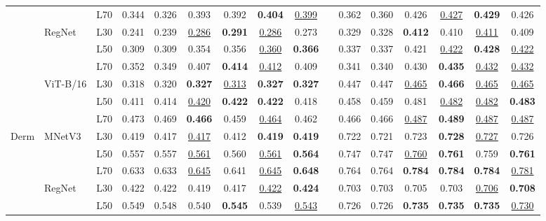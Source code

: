 \begin{table}[t]
{\begin{tabular}{lll cccccc |c cccccc}
 &  & L70 & 0.344 & 0.326 & 0.393 & 0.392 & \textbf{0.404} & \underline{0.399} & & 0.362 & 0.360 & 0.426 & \underline{0.427} & \textbf{0.429} & 0.426 \\
\cmidrule(lr){2-16}
 & \multirow{3}{*}{RegNet} & L30 & 0.241 & 0.239 & \underline{0.286} & \textbf{0.291} & \underline{0.286} & 0.273 & & 0.329 & 0.328 & \textbf{0.412} & 0.410 & \underline{0.411} & 0.409 \\
 &  & L50 & 0.309 & 0.309 & 0.354 & 0.356 & \underline{0.360} & \textbf{0.366} & & 0.337 & 0.337 & 0.421 & \underline{0.422} & \textbf{0.428} & \underline{0.422} \\
 &  & L70 & 0.352 & 0.349 & 0.407 & \textbf{0.414} & \underline{0.412} & 0.409 & & 0.341 & 0.340 & 0.430 & \textbf{0.435} & \underline{0.432} & \underline{0.432} \\
\cmidrule(lr){2-16}
 & \multirow{3}{*}{ViT-B/16} & L30 & 0.318 & 0.320 & \textbf{0.327} & \underline{0.313} & \textbf{0.327} & \textbf{0.327} & & 0.447 & 0.447 & \underline{0.465} & \textbf{0.466} & \underline{0.465} & \underline{0.465} \\
 &  & L50 & 0.411 & 0.414 & \underline{0.420} & \textbf{0.422} & \textbf{0.422} & 0.418 & & 0.458 & 0.459 & 0.481 & \underline{0.482} & \underline{0.482} & \textbf{0.483} \\
 &  & L70 & 0.473 & 0.469 & \textbf{0.466} & 0.459 & \underline{0.464} & 0.462 & & 0.466 & 0.466 & \underline{0.487} & \textbf{0.489} & \underline{0.487} & \underline{0.487} \\
\midrule
\multirow{9}{*}{Derm} & \multirow{3}{*}{MNetV3} & L30 & 0.419 & 0.417 & \underline{0.417} & 0.412 & \textbf{0.419} & \textbf{0.419} & & 0.722 & 0.721 & 0.723 & \textbf{0.728} & \underline{0.727} & 0.726 \\
 &  & L50 & 0.557 & 0.557 & \underline{0.561} & 0.560 & \underline{0.561} & \textbf{0.564} & & 0.747 & 0.747 & \underline{0.760} & \textbf{0.761} & 0.759 & \textbf{0.761} \\
 &  & L70 & 0.633 & 0.633 & \underline{0.645} & 0.641 & \underline{0.645} & \textbf{0.648} & & 0.764 & 0.764 & \textbf{0.784} & \textbf{0.784} & \textbf{0.784} & \underline{0.781} \\
\cmidrule(lr){2-16}
 & \multirow{3}{*}{RegNet} & L30 & 0.422 & 0.422 & 0.419 & 0.417 & \underline{0.422} & \textbf{0.424} & & 0.703 & 0.703 & 0.705 & 0.703 & \underline{0.706} & \textbf{0.708} \\
 &  & L50 & 0.549 & 0.548 & 0.540 & \textbf{0.545} & 0.539 & \underline{0.543} & & 0.726 & 0.726 & \textbf{0.735} & \textbf{0.735} & \textbf{0.735} & \underline{0.730} \\

\end{tabular}}
\end{table}
